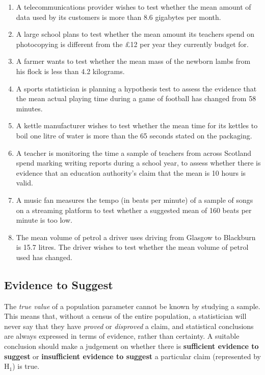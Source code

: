 \documentclass[
  11pt,
]{book}
\begin{document}
\begin{enumerate}
    \item A telecommunications provider wishes to test whether the mean amount of data used by its customers is more than 8.6 gigabytes per month.
    \item A large school plans to test whether the mean amount its teachers spend on photocopying is different from the £12 per year they currently budget for.
    \item A farmer wants to test whether the mean mass of the newborn lambs from his flock is less than 4.2 kilograms.
    \item A sports statistician is planning a hypothesis test to assess the evidence that the mean actual playing time during a game of football has changed from 58 minutes.
    \item A kettle manufacturer wishes to test whether the mean time for its kettles to boil one litre of water is more than the 65 seconds stated on the packaging.
    \item A teacher is monitoring the time a sample of teachers from across Scotland spend marking writing reports during a school year, to assess whether there is evidence that an education authority's claim that the mean is 10 hours is valid.
    \item A music fan measures the tempo (in beats per minute) of a sample of songs on a streaming platform to test whether a suggested mean of 160 beats per minute is too low.
    \item The mean volume of petrol a driver uses driving from Glasgow to Blackburn is 15.7 litres. The driver wishes to test whether the mean volume of petrol used has changed.
\end{enumerate}

\pagebreak

\subsection*{Evidence to Suggest}\label{evidence-to-suggest}

The \emph{true value} of a population parameter cannot be known by studying a sample. This means that, without a census of the entire population, a statistician will never say that they have \emph{proved} or \emph{disproved} a claim, and statistical conclusions are always expressed in terms of evidence, rather than certainty. A suitable conclusion should make a judgement on whether there is \textbf{sufficient evidence to suggest} or \textbf{insufficient evidence to suggest} a particular claim (represented by \(\text{H}_\text{1}\)) is true.
\end{document}
